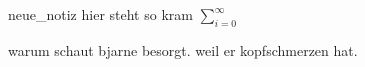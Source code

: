 \documentclass[class=article, crop=false]{standalone}
\begin{document}
\begin{zettel}{neue_notiz}
hier steht so kram $\sum_{i=0}^{\infty}$

\begin{flashcard}[172gksij]{warum schaut bjarne besorgt.}
	weil er kopfschmerzen hat.
\end{flashcard}
\end{zettel}
\end{document}

